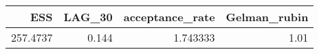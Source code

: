 \begin{longtable}{rrrr}
\toprule
ESS & LAG\_30 & acceptance\_rate & Gelman\_rubin \\ 
\midrule
257.4737 & 0.144 & 1.743333 & 1.01 \\ 
\bottomrule
\end{longtable}

